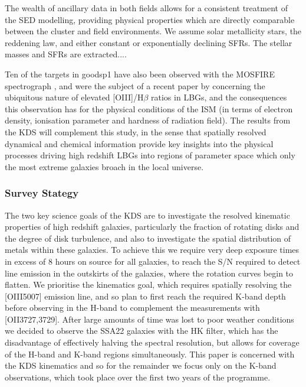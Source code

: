 \documentclass[a4paper,fleqn,usenatbib]{mn2e}
\begin{document}
The wealth of ancillary data in both fields allows for a consistent treatment of the SED modelling, providing physical properties which are directly comparable between the cluster and field environments.
We assume solar metallicity stars, the \cite{Calzetti2000} reddening law, and either constant or exponentially declining SFRs.
The stellar masses and SFRs are extracted....

Ten of the targets in goodsp1 have also been observed with the MOSFIRE spectrograph \citep{McLean2012}, and were the subject of a recent paper by \cite{Holden2016} concerning the ubiquitous nature of elevated [OIII]/H$\beta$ ratios in LBGs, and the consequences this observation has for the physical conditions of the ISM (in terms of electron density, ionisation parameter and hardness of radiation field).
The results from the KDS will complement this study, in the sense that spatially resolved dynamical and chemical information provide key insights into the physical processes driving high redshift LBGs into regions of parameter space which only the most extreme galaxies broach in the local universe.

\subsubsection{Survey Stategy}
The two key science goals of the KDS are to investigate the resolved kinematic properties of high redshift galaxies, particularly the fraction of rotating disks and the degree of disk turbulence, and also to investigate the spatial distribution of metals within these galaxies.
To achieve this we require very deep exposure times in excess of 8 hours on source for all galaxies, to reach the S/N required to detect line emission in the outskirts of the galaxies, where the rotation curves begin to flatten.
We prioritise the kinematics goal, which requires spatially resolving the [OIII5007] emission line, and so plan to first reach the required K-band depth before observing in the H-band to complement the measurements with [OII3727,3729].
After large amounts of time was lost to poor weather conditions we decided to observe the SSA22 galaxies with the HK filter, which has the disadvantage of effectively halving the spectral resolution, but allows for coverage of the H-band and K-band regions simultaneously.
This paper is concerned with the KDS kinematics and so for the remainder we focus only on the K-band observations, which took place over the first two years of the programme. 
\end{document}
